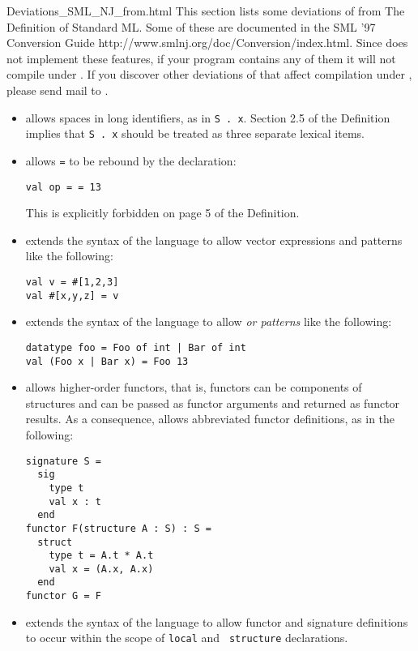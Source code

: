    {Deviations_SML_NJ_from.html}
%
This section lists some deviations of {\smlnj} from The Definition of
Standard ML.  Some of these are documented in the 
\htmladdnormallink
  {SML '97 Conversion Guide}
  {http://www.smlnj.org/doc/Conversion/index.html}.
Since {\mlton} does not implement these features, if your program
contains any of them it will not compile under {\mlton}.  If you discover
other deviations of {\smlnj} that affect compilation under {\mlton},
please send mail to {\mltonmail}.

\begin{itemize}
\item
{\smlnj} allows spaces in long identifiers, as in {\tt S . x}.
Section 2.5 of the Definition implies that {\tt S . x} should be
treated as three separate lexical items.

\item
{\smlnj} allows {\tt =} to be rebound by the declaration:
\begin{verbatim}
val op = = 13
\end{verbatim}
This is explicitly forbidden on page 5 of the Definition.

\item
{\smlnj} extends the syntax of the language to allow
vector expressions and patterns like the following:
\begin{verbatim}
val v = #[1,2,3]
val #[x,y,z] = v
\end{verbatim}
%
\item 
{\smlnj} extends the syntax of the language to allow {\em or patterns}
like the following:
\begin{verbatim}
datatype foo = Foo of int | Bar of int
val (Foo x | Bar x) = Foo 13
\end{verbatim}
%
\item
{\smlnj} allows higher-order functors, that is, functors can be
components of structures and can be passed as functor arguments and
returned as functor results.  As a consequence, {\smlnj} allows
abbreviated functor definitions, as in the following:
\begin{verbatim}
signature S =
  sig
    type t
    val x : t
  end
functor F(structure A : S) : S = 
  struct
    type t = A.t * A.t
    val x = (A.x, A.x)
  end
functor G = F
\end{verbatim} 
%
\item
{\smlnj} extends the syntax of the language to allow functor and
signature definitions to occur within the scope of {\tt local} and {\tt
structure} declarations.


\end{itemize}
